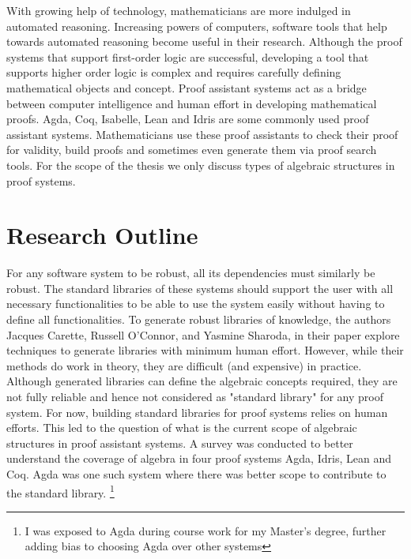 With growing help of technology, mathematicians are more indulged in automated
reasoning. Increasing powers of computers, software tools that help towards
automated reasoning become useful in their research. Although the proof systems
that support first-order logic are successful, developing a tool that supports
higher order logic is complex \cite{phillips2010automated} and requires
carefully defining mathematical objects and concept. Proof assistant systems act
as a bridge between computer intelligence and human effort in developing
mathematical proofs. Agda, Coq, Isabelle, Lean and Idris are some commonly used
proof assistant systems. Mathematicians use these proof assistants to check
their proof for validity, build proofs and sometimes even generate them via
proof search tools. For the scope of the thesis we only discuss types of
algebraic structures in proof systems.

\section{Research Outline}
For any software system to be robust, all its dependencies must similarly be
robust. The standard libraries of these systems should support the user with all
necessary functionalities to be able to use the system easily without having to
define all functionalities. To generate robust libraries of knowledge, the
authors Jacques Carette, Russell O'Connor, and Yasmine Sharoda, in their paper
\cite{BuildingDiamond} explore techniques to generate libraries with minimum
human effort. However, while their methods do work in theory, they are difficult
(and expensive) in practice. Although generated libraries can define the
algebraic concepts required, they are not fully reliable and hence not
considered as "standard library" for any proof system. For now, building
standard libraries for proof systems relies on human efforts. This led to the
question of what is the current scope of algebraic structures in proof assistant
systems. A survey was conducted to better understand the coverage of algebra in
four proof systems Agda, Idris, Lean and Coq. Agda was one such system where
there was better scope to contribute to the standard library. \footnote{I was
exposed to Agda during course work for my Master's degree, further adding bias
to choosing Agda over other systems} 

